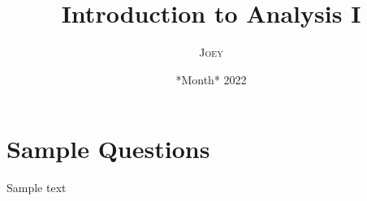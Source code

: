 \documentclass{article}
\title{Introduction to Analysis I}
\author{\textsc{Joey}}
\date{*Month* 2022}
\newcommand{\<}{\langle}
\renewcommand{\>}{\rangle}
\begin{document}
\maketitle
		\section{Sample Questions}
    		Sample text
\end{document}
